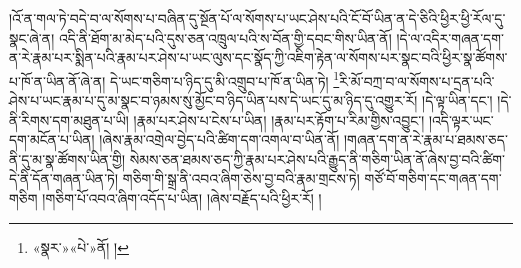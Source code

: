 །འོ་ན་གལ་ཏེ་བདེ་བ་ལ་སོགས་པ་བཞིན་དུ་སྔོན་པོ་ལ་སོགས་པ་ཡང་ཤེས་པའི་ངོ་བོ་ཡིན་ན་དེ་ཅིའི་ཕྱིར་ཕྱི་རོལ་དུ་སྣང་ཞེ་ན། འདི་ནི་ཐོག་མ་མེད་པའི་དུས་ཅན་འཁྲུལ་པའི་ས་བོན་གྱི་དབང་གིས་ཡིན་ནོ། །དེ་ལ་འདིར་གཞན་དག་ན་རེ་རྣམ་པར་སྨིན་པའི་རྣམ་པར་ཤེས་པ་ཡང་ལུས་དང་སྣོད་ཀྱི་འཇིག་རྟེན་ལ་སོགས་པར་སྣང་བའི་ཕྱིར་སྣ་ཚོགས་པ་ཁོ་ན་ཡིན་ནོ་ཞེ་ན། དེ་ཡང་གཅིག་པ་ཉིད་དུ་མི་འགྲུབ་པ་ཁོ་ན་ཡིན་ཏེ། \footnote{«སྣར་»«པེ་»ནོ། ། }རི་མོ་བཀྲ་བ་ལ་སོགས་པ་དྲན་པའི་ཤེས་པ་ཡང་རྣམ་པ་དུ་མ་སྣང་བ་ཉམས་སུ་མྱོང་བ་ཉིད་ཡིན་པས་དེ་ཡང་དུ་མ་ཉིད་དུ་འགྱུར་རོ། །དེ་ལྟ་ཡིན་དང་། །དེ་ནི་རིགས་དག་མཐུན་པ་ཡི། །རྣམ་པར་ཤེས་པ་ངེས་པ་ཡིན། །རྣམ་པར་རྟོག་པ་རིམ་གྱིས་འབྱུང་། །འདི་ལྟར་ཡང་དག་མངོན་པ་ཡིན། །ཞེས་རྣམ་འགྲེལ་བྱེད་པའི་ཚིག་དག་འགལ་བ་ཡིན་ནོ། །གཞན་དག་ན་རེ་རྣམ་པ་ཐམས་ཅད་ནི་དུ་མ་སྣ་ཚོགས་ཡིན་གྱི། སེམས་ཅན་ཐམས་ཅད་ཀྱི་རྣམ་པར་ཤེས་པའི་རྒྱུད་ནི་གཅིག་ཡིན་ནོ་ཞེས་བྱ་བའི་ཚིག་དེ་ནི་དོན་གཞན་ཡིན་ཏེ། གཅིག་གི་སྒྲ་ནི་འབའ་ཞིག་ཅེས་བྱ་བའི་རྣམ་གྲངས་ཏེ། གཙོ་བོ་གཅིག་དང་གཞན་དག་གཅིག །གཅིག་པོ་འབའ་ཞིག་འདོད་པ་ཡིན། །ཞེས་བརྗོད་པའི་ཕྱིར་རོ། །
